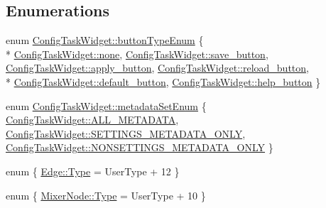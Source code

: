 \subsection*{Enumerations}
\begin{DoxyCompactItemize}
\item 
enum \hyperlink{group___u_a_v_object_widget_utils_gacf8aa6ed9da799d1973519df03d1ecfa}{Config\-Task\-Widget\-::button\-Type\-Enum} \{ \\*
\hyperlink{group___u_a_v_object_widget_utils_ggacf8aa6ed9da799d1973519df03d1ecfaa5ba945be96884ca1ea4e0019425b3fd1}{Config\-Task\-Widget\-::none}, 
\hyperlink{group___u_a_v_object_widget_utils_ggacf8aa6ed9da799d1973519df03d1ecfaad57389b40e61729debc6f0e8fd4cbde2}{Config\-Task\-Widget\-::save\-\_\-button}, 
\hyperlink{group___u_a_v_object_widget_utils_ggacf8aa6ed9da799d1973519df03d1ecfaaeebf9f5769535bd71cb2907073cf1492}{Config\-Task\-Widget\-::apply\-\_\-button}, 
\hyperlink{group___u_a_v_object_widget_utils_ggacf8aa6ed9da799d1973519df03d1ecfaae3d77626c54b30f24b9342696d4155ee}{Config\-Task\-Widget\-::reload\-\_\-button}, 
\\*
\hyperlink{group___u_a_v_object_widget_utils_ggacf8aa6ed9da799d1973519df03d1ecfaa8a58b5c21f9b09e20e74ab163d47f09a}{Config\-Task\-Widget\-::default\-\_\-button}, 
\hyperlink{group___u_a_v_object_widget_utils_ggacf8aa6ed9da799d1973519df03d1ecfaad33ed1c1d7511f14ca49069b8166d04e}{Config\-Task\-Widget\-::help\-\_\-button}
 \}
\item 
enum \hyperlink{group___u_a_v_object_widget_utils_gaf06dbd27444c4e9864e702d7c00b0a62}{Config\-Task\-Widget\-::metadata\-Set\-Enum} \{ \hyperlink{group___u_a_v_object_widget_utils_ggaf06dbd27444c4e9864e702d7c00b0a62ad6334ea913f7c2a28d32a16d52e1aecf}{Config\-Task\-Widget\-::\-A\-L\-L\-\_\-\-M\-E\-T\-A\-D\-A\-T\-A}, 
\hyperlink{group___u_a_v_object_widget_utils_ggaf06dbd27444c4e9864e702d7c00b0a62ac3b6f184c1551bd23d264999d0330302}{Config\-Task\-Widget\-::\-S\-E\-T\-T\-I\-N\-G\-S\-\_\-\-M\-E\-T\-A\-D\-A\-T\-A\-\_\-\-O\-N\-L\-Y}, 
\hyperlink{group___u_a_v_object_widget_utils_ggaf06dbd27444c4e9864e702d7c00b0a62a6ac1f4283fd36cd22e96b56756e26bbe}{Config\-Task\-Widget\-::\-N\-O\-N\-S\-E\-T\-T\-I\-N\-G\-S\-\_\-\-M\-E\-T\-A\-D\-A\-T\-A\-\_\-\-O\-N\-L\-Y}
 \}
\item 
enum \{ \hyperlink{group___u_a_v_object_widget_utils_gga05d42f7e18658014a5ee7236f233e32da59a3ef5ffd963601ffda52bb7bf42b3c}{Edge\-::\-Type} = User\-Type + 12
 \}
\item 
enum \{ \hyperlink{group___u_a_v_object_widget_utils_gga75c1a0485015845b058fbc969b688e5aae34bb4f715b22e70e0a2182529bed883}{Mixer\-Node\-::\-Type} = User\-Type + 10
 \}
\end{DoxyCompactItemize}
